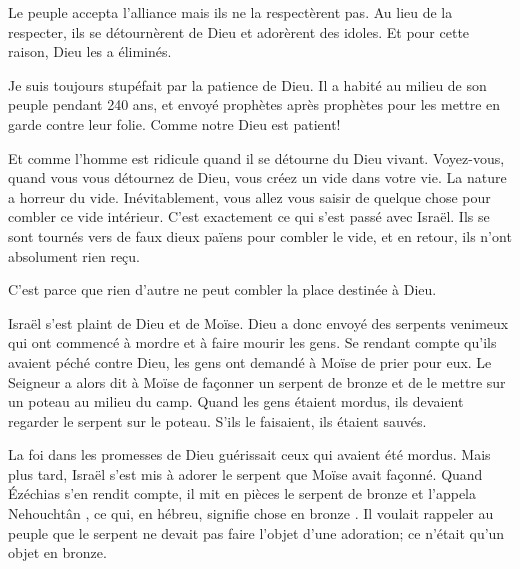 Le peuple accepta l'alliance \ocadr mais ils ne la respectèrent pas.
 Au lieu de la respecter, ils se détournèrent de Dieu
 et adorèrent des idoles. Et pour cette raison, Dieu les a éliminés. 


Je suis toujours stupéfait par la patience de Dieu.
 Il a habité au milieu de son peuple pendant 240 ans,
 et envoyé prophètes après prophètes pour les mettre en garde
 contre leur folie. Comme notre Dieu est patient! 

Et comme l'homme est ridicule quand il se détourne du Dieu vivant.
 Voyez-vous, quand vous vous détournez de Dieu,
 vous créez un vide dans votre vie. La nature a horreur du vide.
 Inévitablement, vous allez vous saisir de quelque chose pour combler
 ce vide intérieur. C'est exactement ce qui s'est passé avec Israël.
 Ils se sont tournés vers de faux dieux païens pour combler le vide,
 et en retour, ils n'ont absolument rien reçu. 

C'est parce que rien d'autre ne peut combler la place destinée à Dieu. 

\dvrule






 Israël s'est plaint
 de Dieu et de Moïse.
 Dieu a donc envoyé des serpents venimeux qui ont commencé à mordre
 et à faire mourir les gens.
 Se rendant compte qu'ils avaient péché contre Dieu,
 les gens ont demandé à Moïse de prier pour eux.
 Le Seigneur a alors dit à Moïse de façonner un serpent de bronze
 et de le mettre sur un poteau au milieu du camp.
 Quand les gens étaient mordus, ils devaient regarder le serpent
 sur le poteau. S'ils le faisaient, ils étaient sauvés. 

La foi dans les promesses de Dieu guérissait ceux qui avaient été mordus.
 Mais plus tard, Israël s'est mis à adorer le serpent
 que Moïse avait façonné. Quand Ézéchias s'en rendit compte,
 il mit en pièces le serpent de bronze et l'appela 
 \og Nehouchtân \fg{},
 ce qui, en hébreu, signifie \og chose en bronze \fg{}.
 Il voulait rappeler au peuple que le serpent ne devait pas faire
 l'objet d'une adoration; ce n'était qu'un objet en bronze. 

